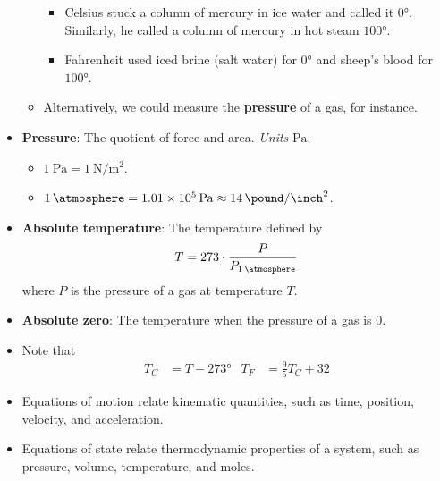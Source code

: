\documentclass[../notes.tex]{subfiles}
\begin{document}
\begin{itemize}
\begin{itemize}
\begin{itemize}
            \item Celsius stuck a column of mercury in ice water and called it $\ang{0}$. Similarly, he called a column of mercury in hot steam $\ang{100}$.
            \item Fahrenheit used iced brine (salt water) for $\ang{0}$ and sheep's blood for $\ang{100}$.
        \end{itemize}
        \item Alternatively, we could measure the \textbf{pressure} of a gas, for instance.
    \end{itemize}
    \item \textbf{Pressure}: The quotient of force and area. \emph{Units} $\si{\pascal}$.
    \begin{itemize}
        \item $\SI{1}{\pascal}=\SI{1}{\newton\per\square\meter}$.
        \item $\SI{1}{\atmosphere}=\SI{1.01e5}{\pascal}\approx\SI{14}{\pound\per\square\inch}$.
    \end{itemize}
    \item \textbf{Absolute temperature}: The temperature defined by
    \begin{equation*}
        T = 273\cdot\frac{P}{P_{\SI{1}{\atmosphere}}}
    \end{equation*}
    where $P$ is the pressure of a gas at temperature $T$.
    \item \textbf{Absolute zero}: The temperature when the pressure of a gas is 0.
    \item Note that
    \begin{align*}
        T_C &= T-\ang{273}&
        T_F &= \frac{9}{5}T_C+32
    \end{align*}
    \item Equations of motion relate kinematic quantities, such as time, position, velocity, and acceleration.
    \item Equations of state relate thermodynamic properties of a system, such as pressure, volume, temperature, and moles.
\end{itemize}
\end{document}
